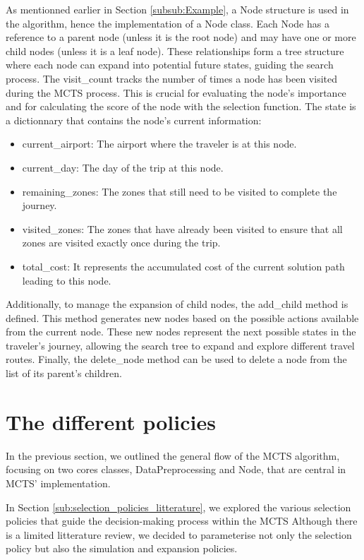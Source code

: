 As mentionned earlier in Section \ref{subsub:Example}, a Node structure is used in the algorithm, hence the implementation of a Node class.
Each Node has a reference to a parent node (unless it is the root node) and may have one or more child nodes (unless it is a leaf node). These relationships form a tree structure where each node can expand into potential future states, guiding the search process.
The visit\_count tracks the number of times a node has been visited during the MCTS process. This is crucial for evaluating the node’s importance and for calculating the score of the node with the selection function.
The state is a dictionnary that contains the node's current information:
\begin{itemize}
    \item current\_airport: The airport where the traveler is  at this node.
    \item current\_day: The day of the trip at this node.
    \item remaining\_zones: The zones that still need to be visited to complete the journey.
    \item visited\_zones: The zones that have already been visited to ensure that all zones are visited exactly once during the trip.
    \item total\_cost: It represents the accumulated cost of the current solution path leading to this node.
\end{itemize}

Additionally, to manage the expansion of child nodes, the add\_child method is defined.
This method generates new nodes based on the possible actions available from the current node. These new nodes represent the next possible states in the traveler’s journey, allowing the search tree to expand and explore different travel routes.
Finally, the delete\_node method can be used to delete a node from the list of its parent's children.


\section{The different policies}
In the previous section, we outlined the general flow of the MCTS algorithm, focusing on two cores classes, DataPreprocessing and Node, that are central in MCTS' implementation.

In Section \ref{sub:selection_policies_litterature}, we explored the various selection policies that guide the decision-making process within the MCTS
Although there is a limited litterature review, we decided to parameterise not only the selection policy but also the simulation and expansion policies.

